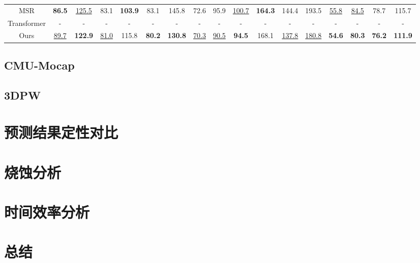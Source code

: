 \begin{table*}[h]
{\begin{tabular}{c|cc|cc|cc|cc|cc|cc|cc|cc}
MSR   & \textbf{86.5} & \underline{125.5}          & 83.1          & \textbf{103.9} & 83.1           & 145.8          & 72.6            & 95.9          & \underline{100.7}         & \textbf{164.3} & 144.4          & 193.5          & \underline{55.8}             & \underline{84.5}             & 78.7           & 115.7          \\
Transformer & -             & -              & -             & -              & -              & -              & -               & -             & -             & -              & -              & -              & -                & -                & -              & -              \\
Ours   & \underline{89.7}          & \textbf{122.9} & \underline{81.0} & 115.8          & \textbf{80.2}  & \textbf{130.8} & \underline{70.3}   & \underline{90.5} & \textbf{94.5} & 168.1          & \underline{137.8} & \underline{180.8}          & \textbf{54.6}    & \textbf{80.3}    & \textbf{76.2}  & \textbf{111.9} \\ \hline
\end{tabular}
}
\label{table:human3.6 long-term 8}
\end{table*}


\clearpage


\subsection{CMU-Mocap}
\subsection{3DPW}

\section{预测结果定性对比}

\section{烧蚀分析}

\section{时间效率分析}

\section{总结}



